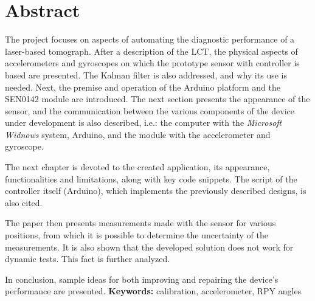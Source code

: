 \chapter*{Abstract}
\indent The project focuses on aspects of automating the diagnostic performance of a laser-based tomograph. After a description of the LCT, the physical aspects of accelerometers and gyroscopes on which the prototype sensor with controller is based are presented. The Kalman filter is also addressed, and why its use is needed. Next, the premise and operation of the Arduino platform and the SEN0142 module are introduced. The next section presents the appearance of the sensor, and the communication between the various components of the device under development is also described, i.e.: the computer with the \emph{Microsoft Widnows} system, Arduino, and the module with the accelerometer and gyroscope.

\indent The next chapter is devoted to the created application, its appearance, functionalities and limitations, along with key code snippets. The script of the controller itself (Arduino), which implements the previously described designs, is also cited.

\indent The paper then presents measurements made with the sensor for various positions, from which it is possible to determine the uncertainty of the measurements. It is also shown that the developed solution does not work for dynamic tests. This fact is further analyzed.

\indent In conclusion, sample ideas for both improving and repairing the device's performance are presented.
\vspace{0.5cm}\newline
\textbf{Keywords:} calibration, accelerometer, RPY angles \vspace{0.5cm}